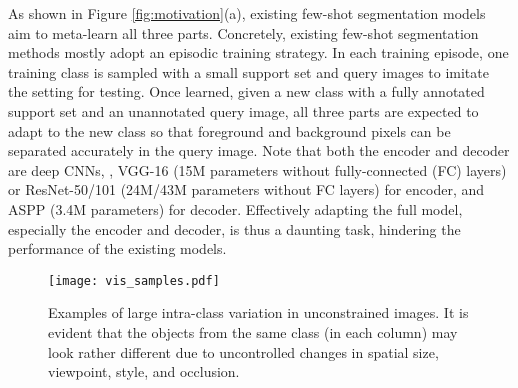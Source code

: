 \documentclass[10pt,twocolumn,letterpaper]{article}
\begin{document}
As shown in Figure \ref{fig:motivation}(a), existing few-shot segmentation models~\cite{shaban2017one, yang2020prototype, zhang2019canet, zhang2020sg} aim to meta-learn all three parts. Concretely, existing few-shot segmentation methods mostly adopt an episodic training strategy. In each training episode, one training class is sampled with a small support set and query images to imitate the setting for testing.  Once learned, given a new class with a fully annotated support set and an unannotated query image, all three parts are expected to adapt to the new class so that foreground and background pixels can be separated accurately in the query image. 
Note that both the encoder and decoder are deep CNNs,
\eg, VGG-16 \cite{simonyan2014very} (15M parameters without fully-connected (FC) layers) or 
ResNet-50/101 \cite{he2016deep} (24M/43M parameters without FC layers) for encoder, and ASPP \cite{chen2017rethinking} (3.4M parameters) for decoder.
Effectively adapting the full model, especially the encoder and decoder, is thus a daunting task, hindering the performance of the existing models. 



\begin{figure}
    \centering
    \texttt{[image: vis\_samples.pdf]}
    \caption{Examples of large intra-class variation in unconstrained images.
    It is evident that the objects from the same class (in each column) may look rather different due to uncontrolled changes in spatial size, viewpoint, style, and occlusion.
}
    \vspace{-0.4cm}
    \label{fig:examples}
\end{figure}
\end{document}
